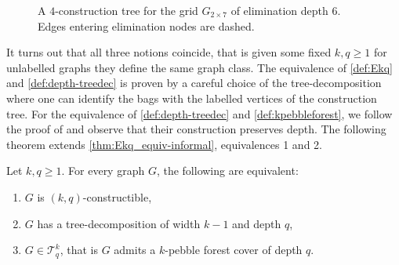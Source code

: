 \documentclass{lmcs}
\theoremstyle{plain}\newtheorem{claim}[thm]{Claim}   %
\newcommand{\cT}{\ensuremath{\mathcal T}}
\newcommand{\Ekq}{\ensuremath{\cT_{q}^{k}}}
\newcommand{\elimOrd}[2]{$(#1,#2)$-constructible}
\newcommand{\grid}[2]{\ensuremath{G_{#1 \times #2}}}
\begin{document}
\begin{figure}
	\caption{A $4$-construction tree for the grid $\grid{2}{7}$ of elimination depth $6$. Edges entering elimination nodes are dashed.}
	\label{fig:elim-example}
\end{figure}

It turns out that all three notions coincide, that is given some fixed $k,q\geq 1$ for unlabelled graphs they define the same graph class.
The equivalence of \autoref{def:Ekq} and \autoref{def:depth-treedec} is proven by a careful choice of the tree-decomposition where one can identify the bags with the labelled vertices of the construction tree.
For the equivalence of \autoref{def:depth-treedec} and \autoref{def:kpebbleforest}, we follow the proof of \cite[Theorem~19]{Abramsky_relating_2021} and observe that their construction preserves depth.
The following theorem extends \autoref{thm:Ekq_equiv-informal}, equivalences 1 and 2.
\newpage

\begin{thm}
	\label{thm:Ekq_equiv}
	Let $k, q\geq 1$. For every graph $G$, the following are equivalent:
	\begin{enumerate}
		\item $G$ is \elimOrd{k}{q},\label{ekqEquiv1}
		\item $G$ has a tree-decomposition of width $k-1$ and depth $q$,\label{ekqEquiv2}
		\item $G\in\Ekq$, that is $G$ admits a $k$-pebble forest cover of depth $q$.\label{ekqEquiv3}
	\end{enumerate}
\end{thm}
\end{document}
